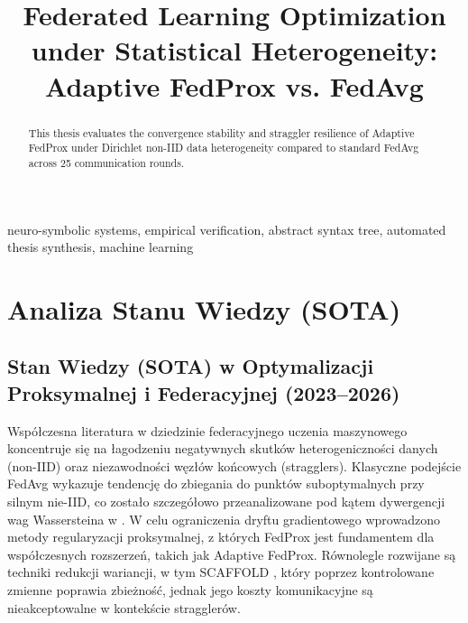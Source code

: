 \documentclass[conference]{IEEEtran}
\begin{document}
\title{Federated Learning Optimization under Statistical Heterogeneity: Adaptive FedProx vs. FedAvg}

\author{
}

\maketitle
\thispagestyle{plain}

\begin{abstract}
This thesis evaluates the convergence stability and straggler resilience of Adaptive FedProx under Dirichlet non-IID data heterogeneity compared to standard FedAvg across 25 communication rounds.
\end{abstract}

\begin{IEEEkeywords}
neuro-symbolic systems, empirical verification, abstract syntax tree, automated thesis synthesis, machine learning
\end{IEEEkeywords}

\section{Analiza Stanu Wiedzy (SOTA)}
\subsection{Stan Wiedzy (SOTA) w Optymalizacji Proksymalnej i Federacyjnej (2023--2026)}

Współczesna literatura w dziedzinie federacyjnego uczenia maszynowego koncentruje się na łagodzeniu negatywnych skutków heterogeniczności danych (non-IID) oraz niezawodności węzłów końcowych (stragglers). Klasyczne podejście FedAvg \cite{mcmahan2017communication} wykazuje tendencję do zbiegania do punktów suboptymalnych przy silnym nie-IID, co zostało szczegółowo przeanalizowane pod kątem dywergencji wag Wassersteina w \cite{zhao2023noniid}. W celu ograniczenia dryftu gradientowego wprowadzono metody regularyzacji proksymalnej, z których FedProx \cite{li2020federated} jest fundamentem dla współczesnych rozszerzeń, takich jak Adaptive FedProx. Równolegle rozwijane są techniki redukcji wariancji, w tym SCAFFOLD \cite{karimireddy2020scaffold}, który poprzez kontrolowane zmienne poprawia zbieżność, jednak jego koszty komunikacyjne są nieakceptowalne w kontekście stragglerów.
\end{document}
